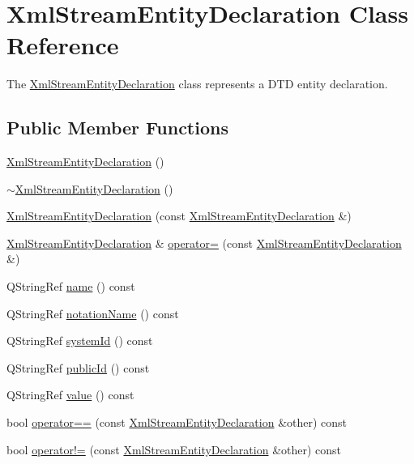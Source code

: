 \hypertarget{class_xml_stream_entity_declaration}{}\section{Xml\+Stream\+Entity\+Declaration Class Reference}
\label{class_xml_stream_entity_declaration}


The \hyperlink{class_xml_stream_entity_declaration}{Xml\+Stream\+Entity\+Declaration} class represents a D\+TD entity declaration.  


\subsection*{Public Member Functions}
\begin{DoxyCompactItemize}
\item 
\hyperlink{class_xml_stream_entity_declaration_a84512094bb6fff3e9878e392942b796d}{Xml\+Stream\+Entity\+Declaration} ()
\item 
\hyperlink{class_xml_stream_entity_declaration_ab0206ec465e688a62948c2aff01d8ff4}{$\sim$\+Xml\+Stream\+Entity\+Declaration} ()
\item 
\hyperlink{class_xml_stream_entity_declaration_ab12e983409a46173d89968dc503b2f20}{Xml\+Stream\+Entity\+Declaration} (const \hyperlink{class_xml_stream_entity_declaration}{Xml\+Stream\+Entity\+Declaration} \&)
\item 
\hyperlink{class_xml_stream_entity_declaration}{Xml\+Stream\+Entity\+Declaration} \& \hyperlink{class_xml_stream_entity_declaration_a597aca72eac0086d5184ffd8b18eb588}{operator=} (const \hyperlink{class_xml_stream_entity_declaration}{Xml\+Stream\+Entity\+Declaration} \&)
\item 
Q\+String\+Ref \hyperlink{class_xml_stream_entity_declaration_a9a80e6de9668c14886616062cf61b247}{name} () const
\item 
Q\+String\+Ref \hyperlink{class_xml_stream_entity_declaration_a4f3ded710f79c36222a4b1abff30a70b}{notation\+Name} () const
\item 
Q\+String\+Ref \hyperlink{class_xml_stream_entity_declaration_a10c98ee5aa7f0c64d531db9674c8d981}{system\+Id} () const
\item 
Q\+String\+Ref \hyperlink{class_xml_stream_entity_declaration_a94f13960262228875b5a6def3fdb7325}{public\+Id} () const
\item 
Q\+String\+Ref \hyperlink{class_xml_stream_entity_declaration_aeea2611b6e86540eb5d41486e001c03f}{value} () const
\item 
bool \hyperlink{class_xml_stream_entity_declaration_a82332fb4374694445d31b54279f9d588}{operator==} (const \hyperlink{class_xml_stream_entity_declaration}{Xml\+Stream\+Entity\+Declaration} \&other) const
\item 
bool \hyperlink{class_xml_stream_entity_declaration_ae5dcfb9b4369290668a69e24fb175064}{operator!=} (const \hyperlink{class_xml_stream_entity_declaration}{Xml\+Stream\+Entity\+Declaration} \&other) const
\end{DoxyCompactItemize}
